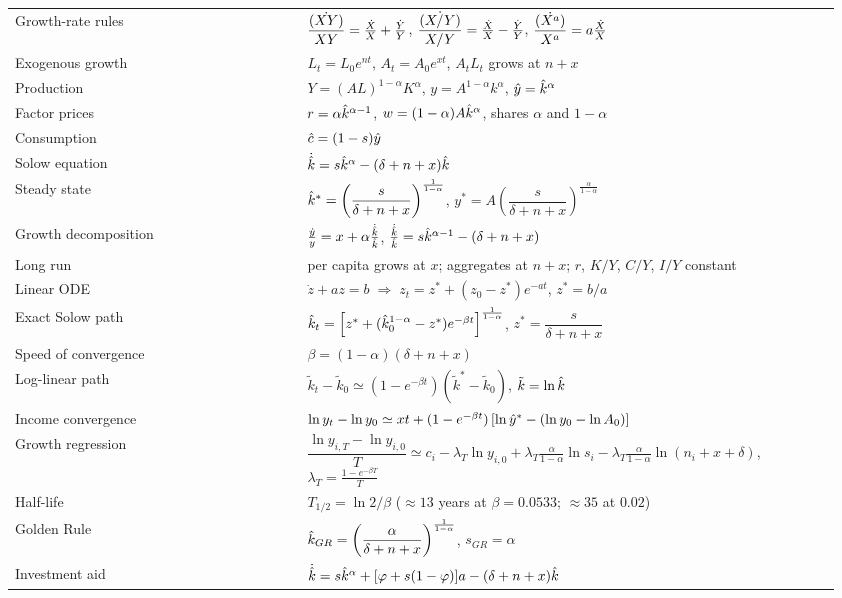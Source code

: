 \documentclass[11pt]{article}
\begin{document}
{\renewcommand{\arraystretch}{1.55}
\begin{tabular}{@{}p{0.34\linewidth}p{0.62\linewidth}@{}}
\toprule
Growth-rate rules & $\dfrac{(\dot{XY})}{XY} = \frac{\dot{X}}{X} + \frac{\dot{Y}}{Y}$, \quad $\dfrac{(\dot{X/Y})}{X/Y} = \frac{\dot{X}}{X} - \frac{\dot{Y}}{Y}$, \quad $\dfrac{(\dot{X^a})}{X^a} = a\frac{\dot{X}}{X}$ \\
Exogenous growth & $L_t = L_0e^{nt}$, \quad $A_t = A_0e^{xt}$, \quad $A_tL_t$ grows at $n + x$ \\
Production & $Y = (AL)^{1-\alpha}K^{\alpha}$, \quad $y = A^{1-\alpha}k^{\alpha}$, \quad $\hat{y} = \hat{k}^{\alpha}$ \\
Factor prices & $r = \alpha\hat{k}^{\alpha-1}$, \quad $w = (1-\alpha)A\hat{k}^{\alpha}$, \quad shares $\alpha$ and $1-\alpha$ \\
Consumption & $\hat{c} = (1-s)\hat{y}$ \\
Solow equation & $\dot{\hat{k}} = s\hat{k}^{\alpha} - (\delta+n+x)\hat{k}$ \\
Steady state & $\hat{k}^* = \left(\dfrac{s}{\delta+n+x}\right)^{\frac{1}{1-\alpha}}$, \quad $y^* = A\left(\dfrac{s}{\delta+n+x}\right)^{\frac{\alpha}{1-\alpha}}$ \\
Growth decomposition & $\frac{\dot{y}}{y} = x + \alpha\frac{\dot{\hat{k}}}{\hat{k}}$, \quad $\frac{\dot{\hat{k}}}{\hat{k}} = s\hat{k}^{\alpha-1} - (\delta+n+x)$ \\
Long run & per capita grows at $x$; aggregates at $n + x$; $r$, $K/Y$, $C/Y$, $I/Y$ constant \\
Linear ODE & $\dot z + az = b \;\Rightarrow\; z_t = z^* + (z_0 - z^*)e^{-at}$, \quad $z^* = b/a$ \\
Exact Solow path & $\hat{k}_t = \left[z^* + (\hat{k}_0^{1-\alpha} - z^*)e^{-\beta t}\right]^{\frac{1}{1-\alpha}}$, \quad $z^* = \dfrac{s}{\delta+n+x}$ \\
Speed of convergence & $\beta = (1-\alpha)(\delta+n+x)$ \\
Log-linear path & $\tilde k_t - \tilde k_0 \simeq (1 - e^{-\beta t})(\tilde k^* - \tilde k_0)$, \quad $\tilde k = \ln\hat{k}$ \\
Income convergence & $\ln y_t - \ln y_0 \simeq xt + (1 - e^{-\beta t})\left[\ln\hat{y}^* - (\ln y_0 - \ln A_0)\right]$ \\
Growth regression & $\dfrac{\ln y_{i,T} - \ln y_{i,0}}{T} \simeq c_i - \lambda_T\ln y_{i,0} + \lambda_T\tfrac{\alpha}{1-\alpha}\ln s_i - \lambda_T\tfrac{\alpha}{1-\alpha}\ln(n_i + x + \delta)$, \quad $\lambda_T = \tfrac{1 - e^{-\beta T}}{T}$ \\
Half-life & $T_{1/2} = \ln 2/\beta$ \quad ($\approx 13$ years at $\beta = 0.0533$; $\approx 35$ at $0.02$) \\
Golden Rule & $\hat{k}_{GR} = \left(\dfrac{\alpha}{\delta+n+x}\right)^{\frac{1}{1-\alpha}}$, \quad $s_{GR} = \alpha$ \\
Investment aid & $\dot{\hat{k}} = s\hat{k}^{\alpha} + [\varphi + s(1-\varphi)]a - (\delta+n+x)\hat{k}$ \\
\bottomrule
\end{tabular}}
\end{document}
